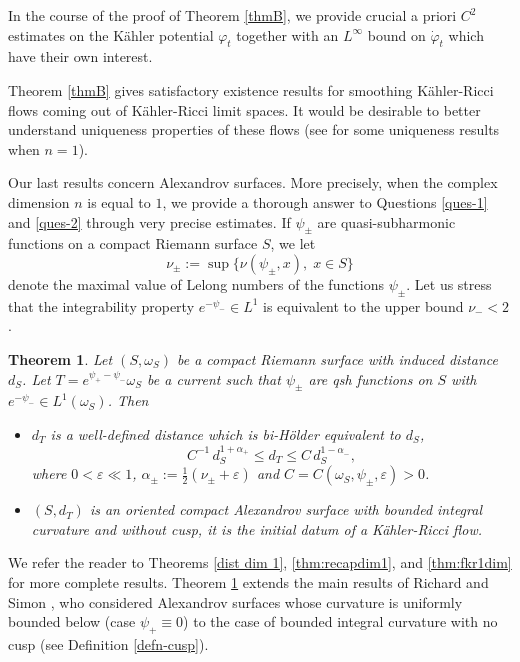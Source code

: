 \documentclass[a4paper,11pt,leqno,english]{smfart}
\theoremstyle{plain}
\theoremstyle{plain}
\newtheorem{bigthm}{Theorem}
\numberwithin{equation}{section} %
\numberwithin{figure}{section} %
\theoremstyle{plain}
\theoremstyle{plain}
\theoremstyle{remark}
\theoremstyle{remark}
\theoremstyle{definition}
\theoremstyle{plain}
\theoremstyle{plain}
\theoremstyle{definition}
\newcommand{\e}{\varepsilon}
\newcommand{\om}{\omega}
\newcommand{\p}{\psi}
\begin{document}
  In the course of the proof of Theorem \ref{thmB}, 
   we provide crucial a priori $C^2$ estimates on the K\"ahler potential $\varphi_t$ together with an $L^{\infty}$ bound on $\dot{\varphi}_t$ which have their own interest.  
   
   Theorem \ref{thmB} gives   satisfactory existence results for smoothing K\"ahler-Ricci flows
coming out of K\"ahler-Ricci limit spaces. It would be desirable to better understand uniqueness
properties of these flows (see  \cite{TY24} for some uniqueness results when $n=1$).

\smallskip

Our last results concern Alexandrov surfaces. More precisely, when the complex dimension $n$ is equal to $1$, we provide a thorough answer to Questions \ref{ques-1} and \ref{ques-2}  through very precise estimates. If $\p_\pm$ are quasi-subharmonic functions on a compact Riemann surface $S$, we let
$$
\nu_{\pm}:=\sup \{ \nu(\p_{\pm},x), \; x \in S \}
$$
denote the maximal value of Lelong numbers of the functions $\p_{\pm}$.
Let us stress that the integrability property $e^{-\p_-} \in L^1$  is equivalent to the upper bound  $\nu_-<2$.


   \begin{bigthm} \label{thmD}
Let $(S,\omega_S)$ be a compact Riemann surface with induced distance $d_S$. Let $T=e^{\p_+-\p_-} \omega_S$ be a current such that $\p_{\pm}$ are qsh functions on $S$ with $e^{-\psi_{-}}\in L^1(\omega_S)$. 
 Then 
 \begin{itemize}
\item[$\bullet$]  $d_T$ is a well-defined distance which is bi-Hölder equivalent to $d_S$,
 \[C^{-1}\,d_{S}^{1+\alpha_+} \leq d_{T} \leq C\,d_{S}^{1-\alpha_-}, \]
 where $0<\e\ll1$, $\alpha_{\pm}:=\frac {1}{2}(\nu_{\pm}+\e)$ and $C=C(\om_S, \p_{\pm}, \e)>0$.
 
 \smallskip
 
 \item[$\bullet$]  $(S,d_T)$ is an oriented compact Alexandrov surface with bounded integral curvature
and without cusp, it is the initial datum of a K\"ahler-Ricci flow. 
\end{itemize}
\end{bigthm} 



We refer the reader to Theorems \ref{dist dim 1}, \ref{thm:recapdim1}, and  \ref{thm:fkr1dim}  
for more complete results. Theorem \ref{thmD} extends the main results of Richard \cite{Rich18} and Simon \cite{Sim12},
who considered Alexandrov surfaces whose curvature is uniformly bounded below
(case $\p_+ \equiv 0$) to the case of bounded integral curvature with no cusp
(see Definition \ref{defn-cusp}).
\end{document}
